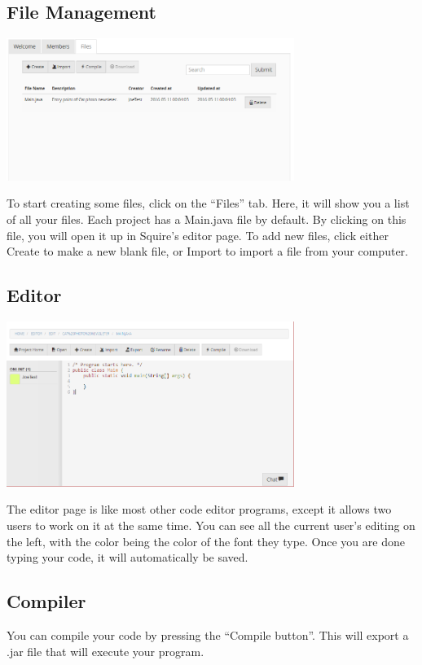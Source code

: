 \documentclass[11pt]{report}
\begin{document}
\subsection{File Management}
	\begin{center}
           \includegraphics[width=0.7\textwidth]{userguide/files}
    \end{center}
    To start creating some files, click on the “Files” tab. Here, it will show you a list of all your files. Each project has a Main.java file by default. By clicking on this file, you will open it up in Squire’s editor page. To add new files, click either Create to make a new blank file, or Import to import a file from your computer. 

\subsection{Editor}
	\begin{center}
           \includegraphics[width=0.7\textwidth]{userguide/editor}
    \end{center}
    The editor page is like most other code editor programs, except it allows two users to work on it at the same time. You can see all the current user's editing on the left, with the color being the color of the font they type. Once you are done typing your code, it will automatically be saved. 

\subsection{Compiler}
    You can compile your code by pressing the “Compile button”. This will export a .jar file that will execute your program. 
\end{document}

